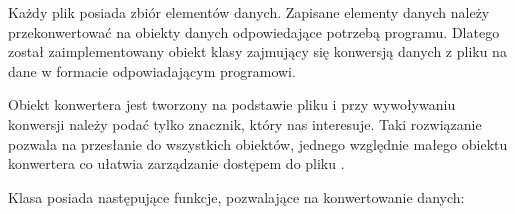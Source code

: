 
\par
Każdy plik \DICOM posiada zbiór elementów danych.
Zapisane elementy danych należy przekonwertować na obiekty danych odpowiedające potrzebą programu.
Dlatego został zaimplementowany obiekt klasy  zajmujący się konwersją danych z pliku \DICOM na dane w formacie odpowiadającym programowi.

\par
Obiekt konwertera jest tworzony na podstawie pliku \DICOM i przy wywoływaniu konwersji należy podać tylko znacznik, który nas interesuje.
Taki rozwiązanie pozwala na przesłanie do wszystkich obiektów, jednego względnie małego obiektu konwertera co ułatwia zarządzanie dostępem do pliku \DICOM.

\par
Klasa  posiada następujące funkcje, pozwalające na konwertowanie danych:
